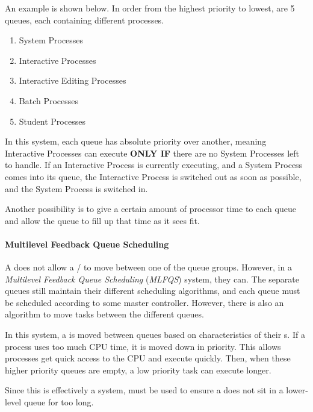 An example  is shown below.
In order from the highest priority to lowest, are 5 queues, each containing different processes.
\begin{enumerate}[noitemsep]
\item System Processes
\item Interactive Processes
\item Interactive Editing Processes
\item Batch Processes
\item Student Processes
\end{enumerate}

In this system, each queue has absolute priority over another, meaning Interactive Processes can execute \textbf{ONLY IF} there are no System Processes left to handle.
If an Interactive Process is currently executing, and a System Process comes into its queue, the Interactive Process is switched out as soon as possible, and the System Process is switched in.

Another possibility is to give a certain amount of processor time to each queue and allow the queue to fill up that time as it sees fit.

\paragraph{Multilevel Feedback Queue Scheduling}\label{par:Multilevel_Feedback_Queue_Scheduling}
A  does not allow a / to move between one of the queue groups.
However, in a \emph{Multilevel Feedback Queue Scheduling} (\emph{MLFQS}) system, they can.
The separate queues still maintain their different scheduling algorithms, and each queue must be scheduled according to some master controller.
However, there is also an algorithm to move tasks between the different queues.

In this system, a  is moved between queues based on characteristics of their s.
If a process uses too much CPU time, it is moved down in priority.
This allows  processes get quick access to the CPU and execute quickly.
Then, when these higher priority queues are empty, a low priority task can execute longer.

Since this is effectively a  system,  must be used to ensure a  does not sit in a lower-level queue for too long.

